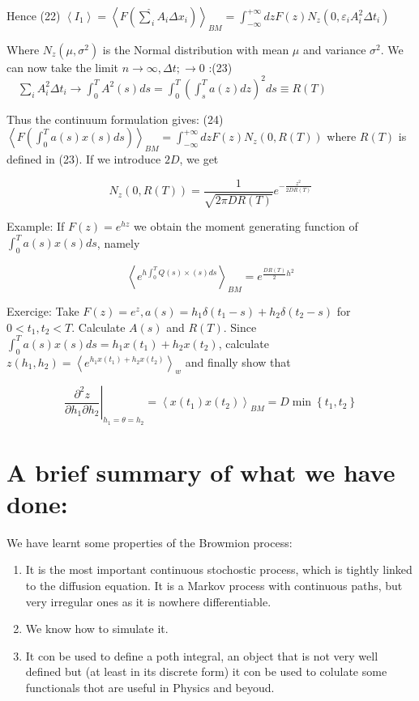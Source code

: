 Hence
(22) $\left\langle I_{1}\right\rangle=\left\langle F\left(\hat{\sum}_{i} A_{i} \Delta x_{i}\right)\right\rangle_{B M}=\int_{-\infty}^{+\infty} d z F(z) N_{z}\left(0, \varepsilon_{i} A_{i}^{2} \Delta t_{i}\right)$

Where $N_{z}\left(\mu, \sigma^{2}\right)$ is the Normal distribution with mean $\mu$ and variance $\sigma^{2}$. We can now take the limit $n \rightarrow \infty, \Delta t ; \rightarrow 0$ :\n(23) $\quad \sum_{i} A_{i}^{2} \Delta t_{i} \longrightarrow \int_{0}^{T} A^{2}(s) d s=\int_{0}^{T}\left(\int_{s}^{T} a(z) d z\right)^{2} d s \equiv R(T)$

Thus the continuum formulation gives:
(24) $\left\langle F\left(\int_{0}^{T} a(s) x(s) d s\right)\right\rangle_{B M}=\int_{-\infty}^{+\infty} d z F(z) N_{z}(0, R(T))$
where $R(T)$ is defined in (23). If we introduce $2 D$, we get

$$ 
N_{z}(0, R(T))=\frac{1}{\sqrt{2 \pi D R(T)}} e^{-\frac{z^{2}}{2 D R(T)}}
$$ 

Example:
If $F(z)=e^{h z}$ we obtain the moment generating function of $\int_{0}^{T} a(s) x(s) d s$, namely

$$ 
\left\langle e^{h \int_{0}^{T} Q(s) \times(s) d s}\right\rangle_{BM}=e^{\frac{D R(T)}{2} h^{2}}
$$ 

Exercige: Take $F(z)=e^{z}, a(s)=h_{1} \delta\left(t_{1}-s\right)+h_{2} \delta\left(t_{2}-s\right)$ for $0<t_{1}, t_{2}<T$. Calculate $A(s)$ and $R(T)$. Since $\int_{0}^{T} a(s) x(s) d s=h_{1} x\left(t_{1}\right)+h_{2} x\left(t_{2}\right)$, calculate $z\left(h_{1}, h_{2}\right)=\left\langle e^{h_{1} x\left(t_{1}\right)+h_{2} x\left(t_{2}\right)}\right\rangle_{w}$ and finally show that


\begin{equation*}
\left.\frac{\partial^{2} z}{\partial h_{1} \partial h_{2}}\right|_{h_{1}=\theta=h_{2}}=\left\langle x\left(t_{1}\right) x\left(t_{2}\right)\right\rangle_{BM}=D \min \left\{t_{1}, t_{2}\right\} \tag{19}
\end{equation*}


\section*{A brief summary of what we have done:}
We have learnt some properties of the Browmion process:

\begin{enumerate}
  \item It is the most important continuous stochostic process, which is tightly linked to the diffusion equation. It is a Markov process with continuous paths, but very irregular ones as it is nowhere differentiable.
  \item We know how to simulate it.
  \item It con be used to define a poth integral, an object that is not very well defined but (at least in its discrete form) it con be used to colulate some functionals thot are useful in Physics and beyoud.
\end{enumerate}

